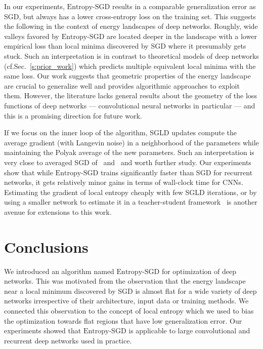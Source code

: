 \documentclass[10pt]{article}
\newcommand{\entropysgd}{\mathrm{Entropy}\textrm{-}\mathrm{SGD}}
\begin{document}
In our experiments, $\entropysgd$ results in a comparable generalization error as SGD, but always has a lower cross-entropy loss on the training set. This suggests the following in the context of energy landscapes of deep networks. Roughly, wide valleys favored by $\entropysgd$ are located deeper in the landscape with a lower empirical loss than local minima discovered by SGD where it presumably gets stuck. Such an interpretation is in contrast to theoretical models of deep networks (cf.\@ Sec.~\ref{s:prior_work}) which predicts multiple equivalent local minima with the same loss. Our work suggests that geometric properties of the energy landscape are crucial to generalize well and provides algorithmic approaches to exploit them. However, the literature lacks general results about the geometry of the loss functions of deep networks --- convolutional neural networks in particular --- and this is a promising direction for future work.

If we focus on the inner loop of the algorithm, SGLD updates compute the average gradient (with Langevin noise) in a neighborhood of the parameters while maintaining the Polyak average of the new parameters. Such an interpretation is very close to averaged SGD of~\citet{polyak1992acceleration} and~\citet{bottou2012stochastic} and worth further study. Our experiments show that while $\entropysgd$ trains significantly faster than SGD for recurrent networks, it gets relatively minor gains in terms of wall-clock time for CNNs. Estimating the gradient of local entropy cheaply with few SGLD iterations, or by using a smaller network to estimate it in a teacher-student framework~\citep{balan2015bayesian} is another avenue for extensions to this work.

\section{Conclusions}
\label{s:conclusions}

We introduced an algorithm named $\entropysgd$ for optimization of deep networks. This was motivated from the observation that the energy landscape near a local minimum discovered by SGD is almost flat for a wide variety of deep networks irrespective of their architecture, input data or training methods. We connected this observation to the concept of local entropy which we used to bias the optimization towards flat regions that have low generalization error. Our experiments showed that $\entropysgd$ is applicable to large convolutional and recurrent deep networks used in practice.
\end{document}
